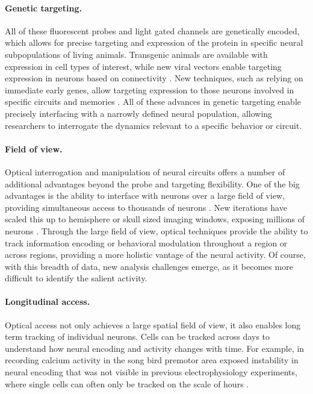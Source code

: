 \paragraph{Genetic targeting.} All of these fluorescent probes 
and light gated channels are genetically encoded, which 
allows for precise targeting and expression of the protein 
in specific neural subpopulations of living animals. 
Transgenic animals are available with expression in cell
types of interest, while new viral vectors enable targeting 
expression in neurons based on connectivity \cite{Tervo:2016go}.
New techniques, such as relying on immediate early genes, 
allow targeting expression to those neurons involved 
in specific circuits and memories \cite{Liu:2012jv}. All 
of these advances in genetic targeting enable precisely
interfacing with a narrowly defined neural population, 
allowing researchers to interrogate the dynamics relevant 
to a specific behavior or circuit.

\paragraph{Field of view.} Optical interrogation and manipulation 
of neural circuits offers a number of additional advantages 
beyond the probe and targeting flexibility. One of the big 
advantages is the ability to interface with neurons over a 
large field of view, providing simultaneous access to thousands 
of neurons \cite{Mohammed:2016fq}. New iterations have scaled 
this up to hemisphere or skull sized imaging windows, exposing 
millions of neurons \cite{Kim:2016hh}. Through the large field 
of view, optical techniques provide the ability to track 
information encoding or behavioral modulation throughout a 
region or across regions, providing a more holistic vantage of
the neural activity. Of course, with this breadth of data, new 
analysis challenges emerge, as it becomes more difficult to 
identify the salient activity.

\paragraph{Longitudinal access.} Optical access not only 
achieves a large spatial field of view, it also enables long
term tracking of individual neurons. Cells can be tracked 
across days to understand how neural encoding and activity 
changes with time. For example, in recording calcium activity 
in the song bird premotor area exposed instability in 
neural encoding \cite{Liberti:2016bc} that was not visible in 
previous electrophysiology experiments, where single cells 
can often only be tracked on the scale of hours 
\cite{Hahnloser:2002hj}.

